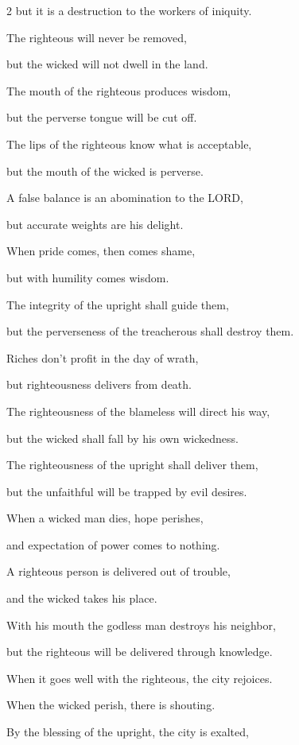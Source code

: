 \begin{multicols}{2}
but it is a destruction to the workers of iniquity.


\myverse{}The righteous will never be removed,

but the wicked will not dwell in the land.


\myverse{}The mouth of the righteous produces wisdom,

but the perverse tongue will be cut off.


\myverse{}The lips of the righteous know what is acceptable,

but the mouth of the wicked is perverse.


\mychapter{} \myverse*{}A false balance is an abomination to the LORD,

\quad\quad but accurate weights are his delight.


\myverse{}When pride comes, then comes shame,

but with humility comes wisdom.


\myverse{}The integrity of the upright shall guide them,

but the perverseness of the treacherous shall destroy them.


\myverse{}Riches don’t profit in the day of wrath,

but righteousness delivers from death.


\myverse{}The righteousness of the blameless will direct his way,

but the wicked shall fall by his own wickedness.


\myverse{}The righteousness of the upright shall deliver them,

but the unfaithful will be trapped by evil desires.


\myverse{}When a wicked man dies, hope perishes,

and expectation of power comes to nothing.


\myverse{}A righteous person is delivered out of trouble,

and the wicked takes his place.


\myverse{}With his mouth the godless man destroys his neighbor,

but the righteous will be delivered through knowledge.


\myverse{}When it goes well with the righteous, the city rejoices.

When the wicked perish, there is shouting.


\myverse{}By the blessing of the upright, the city is exalted,


\end{multicols}
